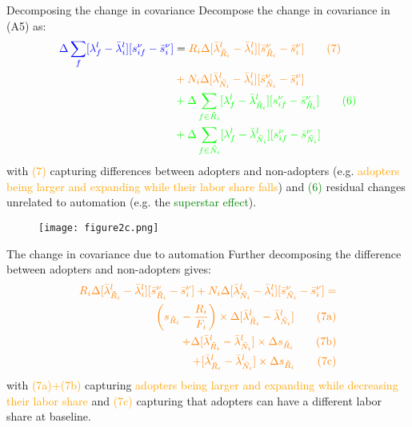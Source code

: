 \documentclass[notes=show]{beamer}
\begin{document}
\begin{frame}{Decomposing the change in covariance}
Decompose the change in covariance in (A5) as:
\begin{align*}
\color{blue} \Delta \sum_{f} [ \lambda_{f}^{l} - \bar{\lambda}_{i}^{l} ] [ s_{if}^{\nu} - \bar{s}_{i}^{\nu} ] & = \color{orange} R_{i}\Delta [ \bar{\lambda}_{\tilde{R}_{i}}^{l} - \bar{\lambda}_{i}^{l} ] [ \bar{s}_{\tilde{R}_{i}}^{\nu} - \bar{s}_{i}^{\nu} ]  \tag{7} \\
& \color{orange} + N_{i} \Delta [ \bar{\lambda}_{\tilde{N}_{i}}^{l} - \bar{\lambda}_{i}^{l} ] [ \bar{s}_{\tilde{N}_{i}}^{\nu} - \bar{s}_{i}^{\nu} ] \\
& \color{green} + \Delta \sum_{f \in \tilde{R}_{i}} [ \lambda_{f}^{l} - \bar{\lambda}_{\tilde{R}_{i}}^{l} ] [ s_{if}^{\nu} - \bar{s}_{\tilde{R}_{i}}^{\nu} ] \tag{6} \\
& \color{green} + \Delta \sum_{f \in \tilde{N}_{i}} [ \lambda_{f}^{l} - \bar{\lambda}_{\tilde{N}_{i}}^{l} ] [ s_{if}^{\nu} - \bar{s}_{\tilde{N}_{i}}^{\nu} ]
\end{align*}
with \textcolor{orange}{(7)} capturing differences between adopters and non-adopters (e.g. \textcolor{orange}{adopters being larger and expanding while their labor share falls}) and \textcolor{green}{(6)} residual changes unrelated to automation (e.g. the \textcolor{green}{superstar effect}).
\end{frame}

\newpage
\begin{center}
\vspace*{0.2cm}
\begin{figure}
\texttt{[image: figure2c.png]}
\end{figure} 
\end{center}
\newpage

\begin{frame}{The change in covariance due to automation}
Further decomposing the difference between adopters and non-adopters gives:
\begin{align*}
\color{orange} R_{i} \Delta [ \bar{\lambda}_{\tilde{R}_{i}}^{l} - \bar{\lambda}_{i}^{l} ] [ \bar{s}_{\tilde{R}_{i}}^{\nu} - \bar{s}_{i}^{\nu} ] + N_{i} \Delta [ \bar{\lambda}_{\tilde{N}_{i}}^{l} - \bar{\lambda}_{i}^{l} ] [ \bar{s}_{\tilde{N}_{i}}^{\nu} - \bar{s}_{i}^{\nu} ] = \\
\color{orange} \left( s_{\tilde{R}_{i}} - \frac{R_{i}}{F_{i}} \right) \times \Delta [ \bar{\lambda}_{\tilde{R}_{i}}^{l} - \bar{\lambda}_{\tilde{N}_{i}}^{l} ] \tag{7a} \\
\color{orange} + \Delta [ \bar{\lambda}_{\tilde{R}_{i}}^{l} - \bar{\lambda}_{\tilde{N}_{i}}^{l} ] \times \Delta s_{\tilde{R}_{i}} \tag{7b} \\
\color{orange} + [ \bar{\lambda}_{\tilde{R}_{i}}^{l} - \bar{\lambda}_{\tilde{N}_{i}}^{l} ] \times \Delta s_{\tilde{R}_{i}} \tag{7c} 
\end{align*}
with \textcolor{orange}{(7a)+(7b)} capturing \textcolor{orange}{adopters being larger and expanding while decreasing their labor share} and \textcolor{orange}{(7c)} capturing that adopters can have a different labor share at baseline.
\end{frame}
\end{document}
